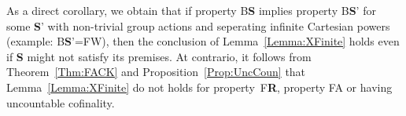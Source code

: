 \documentclass[a4paper]{article}
\theoremstyle{definition}
\newtheorem{rem}[lem]{Remark}
\newcommand*{\category}[1]{\textbf{#1}}
\newcommand*{\CatS}{\category{S}}
\newcommand*{\BS}{B\textbf{S}}
\newcommand*{\FW}{FW}
\newcommand*{\FA}{FA}
\newcommand*{\FR}{F\textbf{R}}
\begin{document}
As a direct corollary, we obtain that if property \BS{} implies property \BS' for some \CatS' with non-trivial group actions and seperating infinite Cartesian powers (example: \BS'=\FW), then the conclusion of Lemma~\ref{Lemma:XFinite} holds even if \CatS{} might not satisfy its premises.
At contrario, it follows from Theorem~\ref{Thm:FACK} and Proposition~\ref{Prop:UncCoun} that Lemma~\ref{Lemma:XFinite} do not holds for property~\FR, property \FA{} or having uncountable cofinality.
%
%
%
%
%
\end{document}
